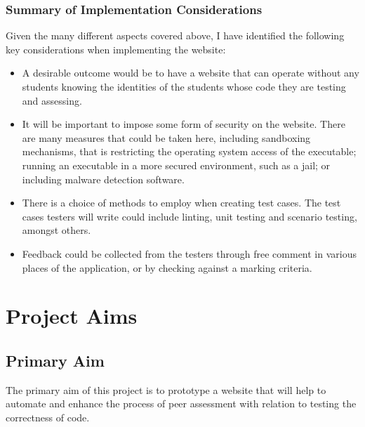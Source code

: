 \documentclass[a4paper,11pt]{report}
\begin{document}
\subsection{Summary of Implementation Considerations}
Given the many different aspects covered above, I have identified the following key considerations when implementing the website:
\begin{itemize}
 \item A desirable outcome would be to have a website that can operate without any students knowing the identities of the students whose code they are testing and assessing.
 \item It will be important to impose some form of security on the website. There are many measures that could be taken here, including sandboxing mechanisms, that is restricting the operating system access of the executable; running an executable in a more secured environment, such as a jail; or including malware detection software.
 \item There is a choice of methods to employ when creating test cases. The test cases testers will write could include linting, unit testing and scenario testing, amongst others.
 \item Feedback could be collected from the testers through free comment in various places of the application, or by checking against a marking criteria.
\end{itemize}






\chapter{Project Aims}
\section{Primary Aim}
The primary aim of this project is to prototype a website that will help to automate and enhance the process of peer assessment with relation to testing the correctness of code.
\end{document}
